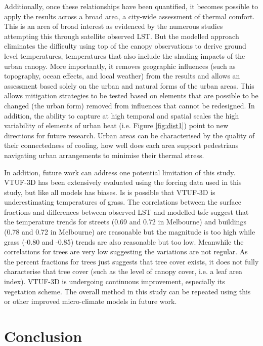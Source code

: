 \documentclass[final,3p,times,authoryear]{elsarticle}
\begin{document}
Additionally, once these relationships have been quantified, it becomes possible to apply the results across a broad area, a city-wide assessment of thermal comfort. This is an area of broad interest as evidenced by the numerous studies attempting this through satellite observed LST. But the modelled approach eliminates the difficulty using top of the canopy observations to derive ground level temperatures, temperatures that also include the shading impacts of the urban canopy. More importantly, it removes geographic influences (such as topography, ocean effects, and local weather) from the results and allows an assessment based solely on the urban and natural forms of the urban areas. This allows mitigation strategies to be tested based on elements that are possible to be changed (the urban form) removed from influences that cannot be redesigned. In addition, the ability to capture at high temporal and spatial scales the high variability of elements of urban heat (i.e. Figure \ref{fig:dist1}) point to new directions for future research. Urban areas can be characterised by the quality of their connectedness of cooling, how well does each area support pedestrians navigating urban arrangements to minimise their thermal stress.

In addition, future work can address one potential limitation of this study. VTUF-3D has been extensively evaluated using the forcing data used in this study, but like all models has biases. Is is possible that VTUF-3D is underestimating temperatures of grass. The correlations between the surface fractions and differences between observed LST and modelled \gls{tsfc} suggest that the temperature trends for streets (0.69 and 0.72 in Melbourne) and buildings (0.78 and 0.72 in Melbourne) are reasonable but the magnitude is too high while grass (-0.80 and -0.85) trends are also reasonable but too low. Meanwhile the correlations for trees are very low suggesting the variations are not regular. As the percent fractions for trees just suggests that tree cover exists, it does not fully characterise that tree cover (such as the level of canopy cover, i.e. a leaf area index). VTUF-3D is undergoing continuous improvement, especially its vegetation scheme. The overall method in this study can be repeated using this or other improved micro-climate models in future work. 

\section{Conclusion}\label{sec:conclusion}
\end{document}
